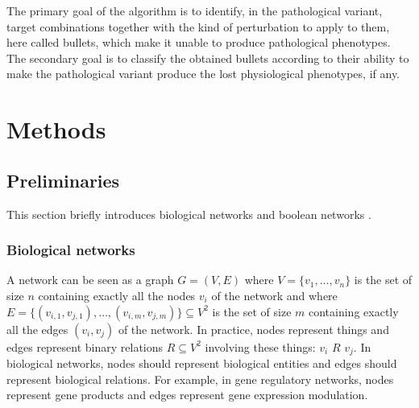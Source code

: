 \documentclass[oneside,a4paper,onecolumn,notitlepage]{article}
\begin{document}
The primary goal of the algorithm is to identify, in the pathological variant, target combinations together with the kind of perturbation to apply to them, here called bullets, which make it unable to produce pathological phenotypes. The secondary goal is to classify the obtained bullets according to their ability to make the pathological variant produce the lost physiological phenotypes, if any.

\section{Methods}
\subsection{Preliminaries}
This section briefly introduces biological networks \cite{zhu2007getting} and boolean networks \cite{saadatpour2012boolean}.

\subsubsection{Biological networks}
A network can be seen as a graph $G=(V,E)$ where $V=\lbrace v_1,\dots,v_n\rbrace$ is the set of size $n$ containing exactly all the nodes $v_i$ of the network and where $E=\lbrace (v_{i,1},v_{j,1}),\dots,(v_{i,m},v_{j,m})\rbrace \subseteq V^2$ is the set of size $m$ containing exactly all the edges $(v_{i},v_{j})$ of the network. In practice, nodes represent things and edges represent binary relations $R\subseteq V^2$ involving these things: $v_{i}$ $R$ $v_{j}$. In biological networks, nodes should represent biological entities and edges should represent biological relations. For example, in gene regulatory networks, nodes represent gene products and edges represent gene expression modulation.
\end{document}
